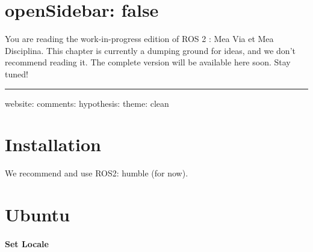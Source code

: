 \documentclass[
  letterpaper,
  DIV=11,
  numbers=noendperiod]{scrreprt}
\begin{document}

\hypertarget{opensidebar-false}{%
\chapter{openSidebar: false}\label{opensidebar-false}}

\begin{tcolorbox}[enhanced jigsaw, titlerule=0mm, opacitybacktitle=0.6, colback=white, colbacktitle=quarto-callout-important-color!10!white, breakable, arc=.35mm, rightrule=.15mm, left=2mm, toprule=.15mm, colframe=quarto-callout-important-color-frame, bottomrule=.15mm, coltitle=black, opacityback=0, toptitle=1mm, title=\textcolor{quarto-callout-important-color}{\faExclamation}\hspace{0.5em}{Important}, leftrule=.75mm, bottomtitle=1mm]

You are reading the work-in-progress edition of ROS 2 : Mea Via et Mea
Disciplina. This chapter is currently a dumping ground for ideas, and we
don't recommend reading it. The complete version will be available here
soon. Stay tuned!

\end{tcolorbox}

\begin{center}\rule{0.5\linewidth}{0.5pt}\end{center}

website: comments: hypothesis: theme: clean


\hypertarget{installation}{%
\chapter{Installation}\label{installation}}

We recommend and use ROS2: humble (for now).


\hypertarget{sec-ubuntu}{%
\chapter{Ubuntu}\label{sec-ubuntu}}

\hypertarget{set-locale}{%
\subsubsection{Set Locale}\label{set-locale}}
\end{document}
